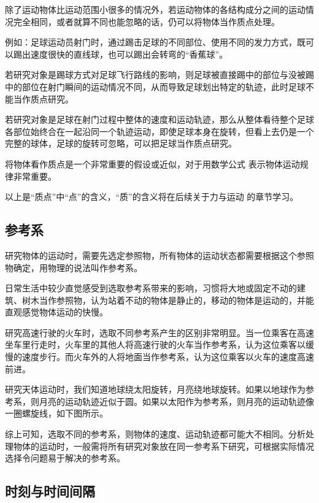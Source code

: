 \documentclass[color=purple]{textbook-cn}%
\begin{document}
除了运动物体比运动范围小很多的情况外，若运动物体的各结构成分之间的运动情况完全相同，或者就算不同也能忽略的话，仍可以将物体当作质点处理。


例如：足球运动员射门时，通过踢击足球的不同部位、使用不同的发力方式，既可以踢出速度很快的直线球，也可以踢出会转弯的“香蕉球”。


若研究对象是踢球方式对足球飞行路线的影响，则足球被直接踢中的部位与没被踢中的部位在射门瞬间的运动情况不同，从而导致足球划出特定的轨迹，此时足球不能当作质点研究。


若研究对象是足球在射门过程中整体的速度和运动轨迹，那么从整体看待整个足球各部位始终合在一起沿同一个轨迹运动，即使足球本身在旋转，但看上去仍是一个完整的球体，足球的旋转可忽略，可以把足球当作质点研究。


将物体看作质点是一个非常重要的假设或近似，对于用数学公式
表示物体运动规律非常重要。


以上是“质点”中“点”的含义，“质”的含义将在后续关于力与运动
的章节学习。



\subsection{参考系}

\begin{Definition*}[参考系]
研究物体的运动时，需要先选定参照物，所有物体的运动状态都需要根据这个参照物确定，用物理的说法叫作\textsf{参考系}。
\end{Definition*}


日常生活中较少直觉感受到选取参考系带来的影响，习惯将大地或固定不动的建筑、树木当作参照物，认为站着不动的物体是静止的，移动的物体是运动的，并能直观感觉物体运动的快慢。


研究高速行驶的火车时，选取不同参考系产生的区别非常明显。当一位乘客在高速坐车里行走时，火车里的其他人将高速行驶的火车当作参考系，认为这位乘客以缓慢的速度步行。而火车外的人将地面当作参考系，认为这位乘客以火车的速度高速前进。


研究天体运动时，我们知道地球绕太阳旋转，月亮绕地球旋转。如果以地球作为参考系，则月亮的运动轨迹近似于圆。如果以太阳作为参考系，则月亮的运动轨迹像一圈螺旋线，如下图所示。


综上可知，选取不同的参考系，则物体的速度、运动轨迹都可能大不相同。分析处理物体的运动时，一般需将所有研究对象放在同一参考系下研究，可根据实际情况选择令问题易于解决的参考系。



\subsection{时刻与时间间隔}
\end{document}
